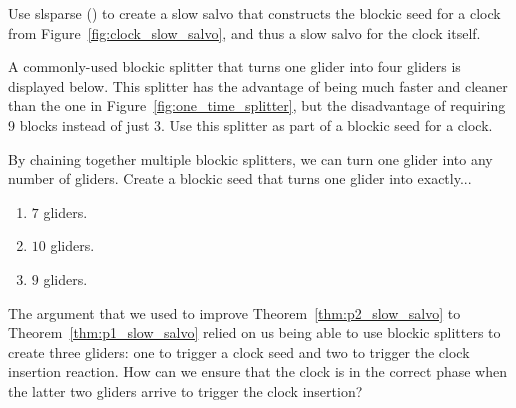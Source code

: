 \begin{multicols}{2}
	
	\mfilbreak
	
	
	\begin{problem}\label{exer:create_clock_turners_nonsync} 
		Use slsparse () to create a slow salvo that constructs the blockic seed for a clock from Figure~\ref{fig:clock_slow_salvo}, and thus a slow salvo for the clock itself.
	\end{problem}
	
	
	\mfilbreak
	
	
	\begin{problem}\label{exer:new_splitter} 
		A commonly-used blockic splitter that turns one glider into four gliders is displayed below. This splitter has the advantage of being much faster and cleaner than the one in Figure~\ref{fig:one_time_splitter}, but the disadvantage of requiring 9 blocks instead of just 3. Use this splitter as part of a blockic seed for a clock.
		\begin{center}
		\end{center}
	\end{problem}
	
	
	\mfilbreak
	
	
	\begin{problem}\label{exer:blockic_splitter_chain} 
		By chaining together multiple blockic splitters, we can turn one glider into any number of gliders. Create a blockic seed that turns one glider into exactly...
		\begin{enumerate}[label=\bf\color{ocre}(\alph*)]
			\item $7$ gliders.
			
			\item $10$ gliders.
			
			\item $9$ gliders.
		\end{enumerate}
	\end{problem}
	
	
	\mfilbreak
	
	
	\begin{problemstar}\label{exer:p2_salvo_reduce_to_p1} 
		The argument that we used to improve Theorem~\ref{thm:p2_slow_salvo} to Theorem~\ref{thm:p1_slow_salvo} relied on us being able to use blockic splitters to create three gliders: one to trigger a clock seed and two to trigger the clock insertion reaction. How can we ensure that the clock is in the correct phase when the latter two gliders arrive to trigger the clock insertion?
	\end{problemstar}
	

\end{multicols}
